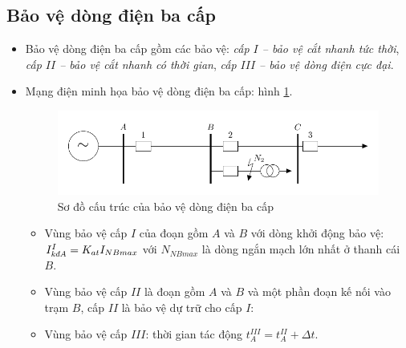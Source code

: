 \documentclass[12pt,a4paper]{article}
\begin{document}
\subsection{Bảo vệ dòng điện ba cấp}
	\begin{itemize}
		\item Bảo vệ dòng điện ba cấp gồm các bảo vệ: \emph{cấp $I$ -- bảo vệ cắt nhanh tức thời}, \emph{cấp $II$ -- bảo vệ cắt nhanh có thời gian}, \emph{cấp $III$ -- bảo vệ dòng điện cực đại}.				
		\item Mạng điện minh họa bảo vệ dòng điện ba cấp: hình \ref{Fig:bvdongdien-bacap}.
			\begin{figure}[!h]
				\begin{center}					
					\includegraphics[scale=1]{diagram-draw-tikz/Figure-baove-dongdienbacap.pdf} 
				\end{center}
				\caption{Sơ đồ cấu trúc của bảo vệ dòng điện ba cấp} \label{Fig:bvdongdien-bacap}
			\end{figure}
			
			\begin{itemize}
				\item Vùng bảo vệ cấp $I$ của đoạn gồm $A$ và $B$ với dòng khởi động bảo vệ: $I_{\text{\textit{kđA}}}^{I} = K_{at}I_{NBmax}$ với $N_{NBmax}$ là dòng ngắn mạch lớn nhất ở thanh cái $B$.
				
				\item Vùng bảo vệ cấp $II$ là đoạn gồm $A$ và $B$ và một phần đoạn kế nối vào trạm $B$, cấp $II$ là bảo vệ dự trữ cho cấp $I$:
					
				\item Vùng bảo vệ cấp $III$: thời gian tác động $t_{A}^{III} = t_{A}^{II} + \Delta t$.
			\end{itemize}
	\end{itemize}
\end{document}
